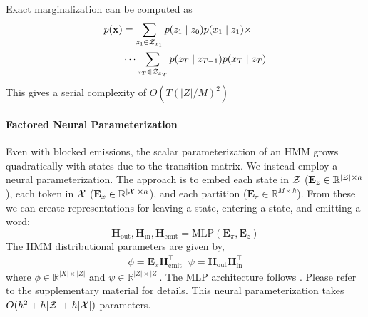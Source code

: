 \documentclass[11pt,a4paper]{article}
\begin{document}
Exact marginalization can be computed as 
\begin{equation}
\label{eqn:sparse_marginalization}
\begin{aligned}
p(\mathbf{x}) &= \sum_{z_1 \in \mathcal{Z}_{x_1}} p(z_1\mid z_0)p(x_1 \mid z_1) \times\\
    &\cdots
    \sum_{z_T \in \mathcal{Z}_{x_T}} p(z_T \mid z_{T-1})p(x_T \mid z_T)
\end{aligned}
\end{equation}
This gives a serial complexity of $O(T(|Z|/M)^2)$




\paragraph{Factored Neural Parameterization}

Even with blocked emissions, the scalar parameterization of an HMM grows quadratically
with states due to the transition matrix.
We instead employ a neural parameterization.
The approach is to embed each state in $\cal Z$ ($\mathbf{E}_z \in \mathbb{R}^{|\mathcal{Z}| \times h}$),
each token in $\cal X$ ($\mathbf{E}_x \in \mathbb{R}^{|\mathcal{X}| \times h}$),
and each partition ($\mathbf{E}_\pi \in \mathbb{R}^{M \times h}$).
From these we can create representations for leaving a state, entering a state,
and emitting a word: 
\[ \mathbf{H}_{\textrm{out}},\mathbf{H}_{\textrm{in}},\mathbf{H}_\textrm{emit}
 = \text{MLP}(\mathbf{E}_\pi, \mathbf{E}_z ) \] 
The HMM distributional parameters are given by,
\begin{equation}
\begin{aligned}
\phi = \mathbf{E}_x \mathbf{H}_\textrm{emit}^\top \;\; 
\psi = \mathbf{H}_\textrm{out} \mathbf{H}_\textrm{in}^\top
\end{aligned}
\end{equation}
where $\phi \in \mathbb{R}^{|X|\times|Z|}$ and
$\psi \in \mathbb{R}^{|Z|\times|Z|}$.
The MLP architecture follows \cite{kim2019cpcfg}.
Please refer to the supplementary material for details. 
This neural parameterization takes $O(h^2 + h|\mathcal{Z}| + h|\mathcal{X}|)$ parameters.
\end{document}
